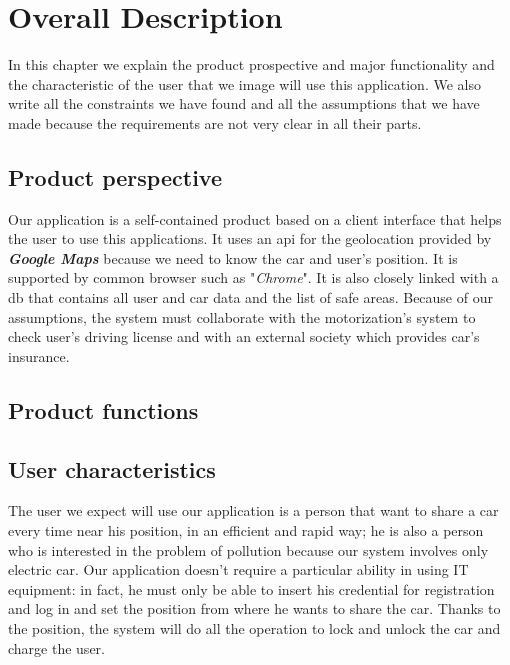 \section{Overall Description} \label{sec:description}
In this chapter we explain the product prospective and major functionality and the characteristic of the user that we image will use this application. We also write all the constraints we have found and all the assumptions that we have made because the requirements are not very clear in all their parts. 

\subsection{Product perspective} \label{subsec:prod_persp}
Our application is a self-contained product based on a client interface that helps the user to use this applications. It uses an \acs{api} for the geolocation provided by \emph{\textbf{Google Maps}} because we need to know the car and user's position. It is supported by common browser such as "\emph{Chrome}". It is also closely linked with a \acs{db} that contains all user and car data and the list of safe areas. Because of our assumptions, the system must collaborate with the motorization's system to check user's driving license and with an external society which provides car's insurance.



\subsection{Product functions} \label{subsec:prod_funct}


\subsection{User characteristics} \label{subsec:user_char}
The user we expect will use our application is a person that want to share a car every time near his position, in an efficient and rapid way; he is also a person who is interested in the problem of pollution because our system involves only electric car. Our application doesn't require a particular ability in using IT equipment: in fact, he must only be able to insert his credential for registration and log in and set the position from where he wants to share the car. Thanks to the position, the system will do all the operation to lock and unlock the car and charge the user.

